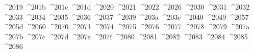 {  ^^^^2019%
  ^^^^201b%
  ^^^^201c%
  ^^^^201d%
  ^^^^2020%
  ^^^^2021%
  ^^^^2022%
  ^^^^2026%
  ^^^^2030%
  ^^^^2031%
  ^^^^2032%
  ^^^^2033%
  ^^^^2034%
  ^^^^2035%
  ^^^^2036%
  ^^^^2037%
  ^^^^2039%
  ^^^^203a%
  ^^^^203c%
  ^^^^2040%
  ^^^^2049%
  ^^^^2057%
  ^^^^205d%
  ^^^^2060%
  ^^^^2070%
  ^^^^2071%
  ^^^^2074%
  ^^^^2075%
  ^^^^2076%
  ^^^^2077%
  ^^^^2078%
  ^^^^2079%
  ^^^^207a%
  ^^^^207b%
  ^^^^207c%
  ^^^^207d%
  ^^^^207e%
  ^^^^207f%
  ^^^^2080%
  ^^^^2081%
  ^^^^2082%
  ^^^^2083%
  ^^^^2084%
  ^^^^2085%
  ^^^^2086%
}
